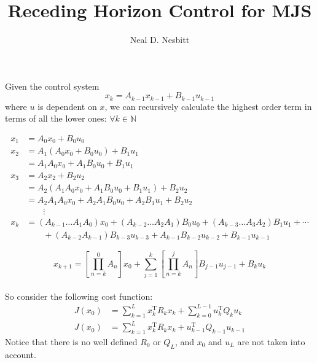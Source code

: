 \documentclass{article}
\title{Receding Horizon Control for MJS}
\author{Neal D. Nesbitt}
\begin{document}
\maketitle

\theoremstyle{definition}
\newtheorem{definition}{Definition}[section]
\newtheorem{corollary}{Corollary}[section]
\newtheorem{theorem}{Theorem}[section]


Given the control system
\[ x_{k} = A_{k-1}x_{k-1} + B_{k-1}u_{k-1} \]
where $u$ is dependent on $x$, we can recursively calculate the highest order term in terms of all the lower ones: $\forall k \in\mathbb{N}$

\begin{align*}
x_{1} &= A_{0}x_{0} + B_{0}u_{0} \\
x_{2} &= A_{1}\left( A_{0}x_{0} + B_{0}u_{0} \right) + B_{1}u_{1} \\
&= A_{1}A_{0}x_{0} + A_{1}B_{0}u_{0} + B_{1}u_{1} \\
x_{3} &= A_{2}x_{2} + B_{2}u_{2} \\
&= A_{2}\left( A_{1}A_{0}x_{0} + A_{1}B_{0}u_{0} + B_{1}u_{1} \right) + B_{2}u_{2} \\
&= A_{2}A_{1}A_{0}x_{0} + A_{2}A_{1}B_{0}u_{0} + A_{2}B_{1}u_{1} + B_{2}u_{2} \\
& \qquad \vdots \\
x_{k} &= \left( A_{k-1}\dots A_{1}A_{0} \right) x_{0} + \left( A_{k-2}\dots A_{2}A_{1} \right)B_{0}u_{0} + \left( A_{k-3}\dots A_{3}A_{2} \right)B_{1}u_{1} + \cdots \\ 
& \qquad + \left( A_{k-2}A_{k-1} \right) B_{k-3}u_{k-3} + A_{k-1}B_{k-2}u_{k-2} + B_{k-1}u_{k-1}
\end{align*}

\[ x_{k+1} = \left[ \prod_{n = k}^{0} A_{n} \right]x_{0} + \sum_{j = 1}^{k} \left[ \prod_{n = k}^{j} A_{n} \right]B_{j-1}u_{j-1} + B_{k}u_{k} \]

\paragraph{}
So consider the following cost function:
\begin{align*}
J(x_{0}) &= \sum_{k = 1}^{L} x_{k}^{\text{T}}R_{k}x_{k} + \sum_{k = 0}^{L-1} u_{k}^{\text{T}}Q_{k}u_{k} \\
J(x_{0}) &= \sum_{k = 1}^{L} x_{k}^{\text{T}}R_{k}x_{k} + u_{k-1}^{\text{T}}Q_{k-1}u_{k-1}
\end{align*}
Notice that there is no well defined $R_{0}$ or $Q_{L}$, and $x_{0}$ and $u_{L}$ are not taken into account.
\end{document}
